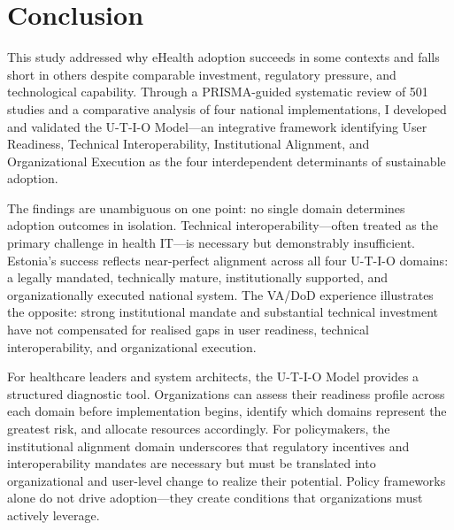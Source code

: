\section{Conclusion}

This study addressed why eHealth adoption succeeds in some contexts and falls short in others despite comparable investment, regulatory pressure, and technological capability. Through a PRISMA-guided systematic review of 501 studies and a comparative analysis of four national implementations, I developed and validated the U-T-I-O Model—an integrative framework identifying User Readiness, Technical Interoperability, Institutional Alignment, and Organizational Execution as the four interdependent determinants of sustainable adoption.

The findings are unambiguous on one point: no single domain determines adoption outcomes in isolation. Technical interoperability—often treated as the primary challenge in health IT—is necessary but demonstrably insufficient. Estonia's success reflects near-perfect alignment across all four U-T-I-O domains: a legally mandated, technically mature, institutionally supported, and organizationally executed national system. The VA/DoD experience illustrates the opposite: strong institutional mandate and substantial technical investment have not compensated for realised gaps in user readiness, technical interoperability, and organizational execution.

For healthcare leaders and system architects, the U-T-I-O Model provides a structured diagnostic tool. Organizations can assess their readiness profile across each domain before implementation begins, identify which domains represent the greatest risk, and allocate resources accordingly. For policymakers, the institutional alignment domain underscores that regulatory incentives and interoperability mandates are necessary but must be translated into organizational and user-level change to realize their potential. Policy frameworks alone do not drive adoption—they create conditions that organizations must actively leverage.

